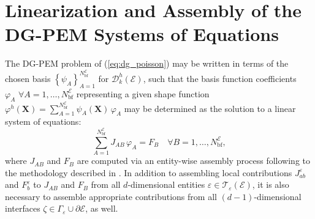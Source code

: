 \section{Linearization and Assembly of the DG-PEM Systems of Equations}

	The DG-PEM problem of (\ref{eq:dg_poisson}) may be written in terms of the chosen basis $\left\{ \psi_A \right\}_{A=1}^{N^\mathcal{E}_{\mathrm b\mathrm f}}$ for $\mathcal{D}^h_k (\mathcal{E})$, such that the basis function coefficients $\varphi_A \, \, \forall A = 1, \ldots, N^\mathcal{E}_{\mathrm b\mathrm f}$ representing a given shape function $\varphi^h (\bm{X}) = \sum_{A=1}^{N^\mathcal{E}_{\mathrm b\mathrm f}} \psi_A (\bm{X}) \, \varphi_A$ may be determined as the solution to a linear system of equations:
	\begin{equation}
		\sum_{A=1}^{N^\mathcal{E}_{\mathrm b\mathrm f}} J_{AB} \, \varphi_A = F_B \quad \forall B = 1, \ldots, N^\mathcal{E}_{\mathrm b\mathrm f},
		\label{eq:linearization_dgpem}
	\end{equation}
	where $J_{AB}$ and $F_B$ are computed via an entity-wise assembly process following to the methodology described in \cite{Riviere:08}. In addition to assembling local contributions $J^\varepsilon_{ab}$ and $F^\varepsilon_b$ to $J_{AB}$ and $F_B$ from all $d$-dimensional entities $\varepsilon \in \mathcal{T}_\varepsilon (\mathcal{E})$, it is also necessary to assemble appropriate contributions from all $(d-1)$-dimensional interfaces $\zeta \in \Gamma_\varepsilon \cup \partial \mathcal{E}$, as well.

